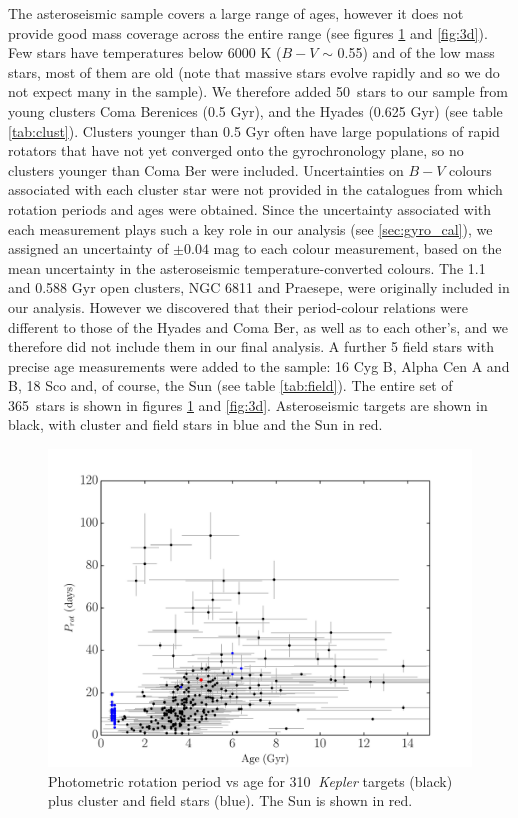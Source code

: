 \documentclass[useAMS, usenatbib]{mn2e}
\newcommand{\nastero}{310}
\newcommand{\nHC}{50~}
\newcommand{\ntotal}{365~}
\begin{document}
The asteroseismic sample covers a large range of ages, however it does not
provide good mass coverage across the entire range (see figures
\ref{fig:p_vs_a} and \ref{fig:3d}).
Few stars have temperatures below 6000 K ($B-V$ $\sim$ 0.55) and of the low
mass stars, most of them are old (note that massive stars evolve rapidly and
so we do not expect many in the sample).
We therefore added \nHC stars to our sample from young clusters Coma Berenices
(0.5 Gyr), and the Hyades (0.625 Gyr) (see table \ref{tab:clust}).
Clusters younger than 0.5 Gyr often have large populations of rapid rotators
that have not yet converged onto the gyrochronology plane, so no clusters
younger than Coma Ber were included.
Uncertainties on $B-V$ colours associated with each cluster star were not
provided in the catalogues from which rotation periods and ages were obtained.
Since the uncertainty associated with each measurement plays such a key role
in our analysis (see \textsection \ref{sec:gyro_cal}), we assigned an
uncertainty of $\pm 0.04$ mag to each colour measurement, based on the mean
uncertainty in the asteroseismic temperature-converted colours.
The 1.1 and 0.588 Gyr open clusters, NGC 6811 and Praesepe, were originally
included in our analysis.
However we discovered that their period-colour relations were different to
those of the Hyades and Coma Ber, as well as to each other's, and we therefore
did not include them in our final analysis.
A further 5 field stars with precise age measurements were added to the
sample: 16 Cyg B, Alpha Cen A and B, 18 Sco and, of course, the Sun (see table
\ref{tab:field}).
The entire set of \ntotal stars is shown in figures \ref{fig:p_vs_a} and
\ref{fig:3d}.
Asteroseismic targets are shown in black, with cluster and field stars in blue
and the Sun in red.

\begin{figure}
\begin{center}
\includegraphics[width=6in, clip=true]{p_vs_a_paper2.pdf}
\caption{Photometric rotation period vs age for \nastero$~$ {\it Kepler}
	targets (black) plus cluster and field stars (blue). The Sun is shown
	in red.
\label{fig:p_vs_a}}
\end{center}
\end{figure}
\end{document}
